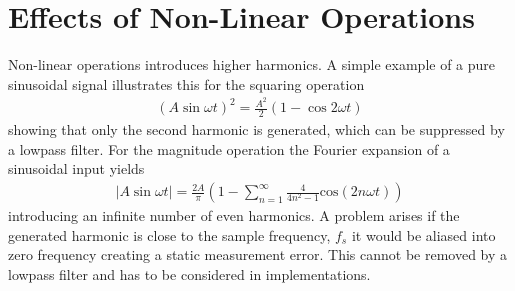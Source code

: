 \documentclass[../main2.tex]{subfiles}
\begin{document}
\section{Effects of Non-Linear Operations} \label{non_lin_ops}
Non-linear operations introduces higher harmonics. A simple example of a pure sinusoidal signal illustrates this for the squaring operation
\begin{align}
(A\sin{\omega t})^2 = \frac{A^2}{2}(1-\cos{2\omega t}) 
\end{align}
showing that only the second harmonic is generated, which can be suppressed by a lowpass filter.
For the magnitude operation the Fourier expansion of a sinusoidal input yields
\begin{align}
\left |A\sin{\omega t}\right | = \frac{2A}{\pi}\left (1 - \sum_{n=1}^{\infty}\frac{4}{4n^2-1} \text{cos} (2n\omega t) \right) 
\end{align}
introducing an infinite number of even harmonics. A problem arises if the generated harmonic is close to the sample frequency, $f_s$ it would be aliased into zero frequency creating a static measurement error. This cannot be removed by a lowpass filter and has to be considered in implementations.
\end{document}
